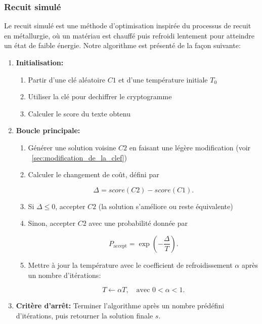 \documentclass[a4paper]{article}
\begin{document}
\subsubsection{Recuit simulé}
Le recuit simulé est une méthode d’optimisation inspirée du processus de recuit en métallurgie, où un matériau est chauffé puis refroidi lentement pour atteindre un état de faible énergie.
Notre algorithme est présenté de la façon suivante:
\begin{enumerate}
    \item \textbf{Initialisation:} 
    \begin{enumerate}
        \item Partir d'une clé aléatoire $C1$ et d'une température initiale $T_0$
        \item Utiliser la clé pour dechiffrer le cryptogramme
        \item Calculer le score du texte obtenu
    \end{enumerate}
    \item \textbf{Boucle principale:}
    \begin{enumerate}[label= (\alph*)]
        \item Générer une solution voisine $C2$ en faisant une légère modification (voir ~\ref{sec:modification_de_la_clef})
        \item Calculer le changement de coût, défini par
        

        \[
            \Delta = score(C2) - score(C1).
        \]


        \item Si $\Delta \leq 0$, accepter $C2$ (la solution s'améliore ou reste équivalente)
        \item Sinon, accepter $C2$ avec une probabilité donnée par
        

        \[
            P_{\text{accept}} = \exp\left(-\frac{\Delta}{T}\right).
        \]


        \item Mettre à jour la température avec le coefficient de refroidissement $\alpha$ après un nombre d'itérations:
        

        \[
            T \leftarrow \alpha T, \quad \text{avec } 0 < \alpha < 1.
        \]


    \end{enumerate}
    
    \item \textbf{Critère d'arrêt:} Terminer l'algorithme après un nombre prédéfini d'itérations, puis retourner la solution finale $s$.
\end{enumerate}
\end{document}
